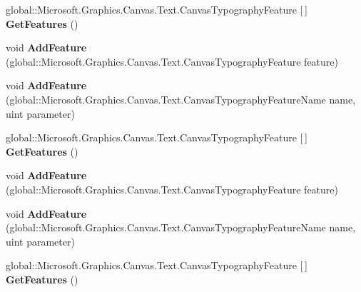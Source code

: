 \begin{DoxyCompactItemize}
global\+::\+Microsoft.\+Graphics.\+Canvas.\+Text.\+Canvas\+Typography\+Feature \mbox{[}$\,$\mbox{]} {\bfseries Get\+Features} ()
\item 
\mbox{\label{interface_microsoft_1_1_graphics_1_1_canvas_1_1_text_1_1_i_canvas_typography_a411e4a2a41c0157396db12ec2acab31d}} 
void {\bfseries Add\+Feature} (global\+::\+Microsoft.\+Graphics.\+Canvas.\+Text.\+Canvas\+Typography\+Feature feature)
\item 
\mbox{\label{interface_microsoft_1_1_graphics_1_1_canvas_1_1_text_1_1_i_canvas_typography_a2c8dc7baaa1737f81e1d72911b2e12ab}} 
void {\bfseries Add\+Feature} (global\+::\+Microsoft.\+Graphics.\+Canvas.\+Text.\+Canvas\+Typography\+Feature\+Name name, uint parameter)
\item 
\mbox{\label{interface_microsoft_1_1_graphics_1_1_canvas_1_1_text_1_1_i_canvas_typography_af297984550baf8fc4cbe7241965025ca}} 
global\+::\+Microsoft.\+Graphics.\+Canvas.\+Text.\+Canvas\+Typography\+Feature \mbox{[}$\,$\mbox{]} {\bfseries Get\+Features} ()
\item 
\mbox{\label{interface_microsoft_1_1_graphics_1_1_canvas_1_1_text_1_1_i_canvas_typography_a411e4a2a41c0157396db12ec2acab31d}} 
void {\bfseries Add\+Feature} (global\+::\+Microsoft.\+Graphics.\+Canvas.\+Text.\+Canvas\+Typography\+Feature feature)
\item 
\mbox{\label{interface_microsoft_1_1_graphics_1_1_canvas_1_1_text_1_1_i_canvas_typography_a2c8dc7baaa1737f81e1d72911b2e12ab}} 
void {\bfseries Add\+Feature} (global\+::\+Microsoft.\+Graphics.\+Canvas.\+Text.\+Canvas\+Typography\+Feature\+Name name, uint parameter)
\item 
\mbox{\label{interface_microsoft_1_1_graphics_1_1_canvas_1_1_text_1_1_i_canvas_typography_af297984550baf8fc4cbe7241965025ca}} 
global\+::\+Microsoft.\+Graphics.\+Canvas.\+Text.\+Canvas\+Typography\+Feature \mbox{[}$\,$\mbox{]} {\bfseries Get\+Features} ()

\end{DoxyCompactItemize}
